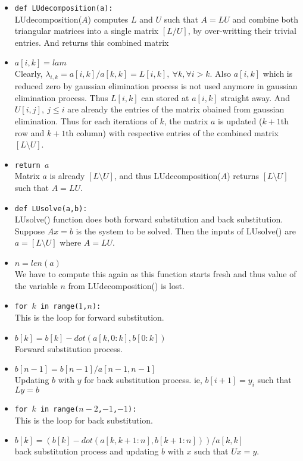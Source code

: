 \begin{remark}
\begin{commentary}
	\begin{itemize}
		\item \texttt{def LUdecomposition(a):} \\ LUdecomposition($A$) computes $L$ and $U$ such that $A = LU$ and combine both triangular matrices into a single matrix $[L/U]$, by over-writting their trivial entries. And returns this combined matrix
		\item \texttt{$a[i,k]=lam$} \\ Clearly, $\lambda_{i,k} = a[i,k]/a[k,k] = L[i,k],\ \forall k, \forall i>k$. Also $a[i,k]$ which is reduced zero by gaussian elimination process is not used anymore in gaussian elimination process. Thus $L[i,k]$ can stored at $a[i,k]$ straight away. And $U[i,j],\ j\le i$ are already the entries of the matrix obained from gaussian elimination. Thus for each iterations of $k$, the matrix $a$ is updated ($k+1$th row and $k+1$th column) with respective entries of the combined matrix $[L\text{\textbackslash{}}U]$.
		\item \texttt{return $a$} \\ Matrix $a$ is already $[L\text{\textbackslash{}}U]$, and thus LUdecomposition($A$) returns $[L\text{\textbackslash{}}U]$ such that $A = LU$.
		\item \texttt{def LUsolve(a,b):} \\ LUsolve() function does both forward substitution and back substitution. Suppose $Ax = b$ is the system to be solved. Then the inputs of LUsolve() are $ a = [L\text{\textbackslash{}}U]$ where $A = LU$. 
		\item \texttt{$n = len(a)$} \\ We have to compute this again as this function starts fresh and thus value of the variable $n$ from LUdecomposition() is lost.
		\item \texttt{for $k$ in range($1$,$n$):} \\ This is the loop for forward substitution.
		\item \texttt{$b[k] = b[k]-dot(a[k,0:k],b[0:k])$} \\ Forward substitution process.
		\item \texttt{$b[n-1] = b[n-1]/a[n-1,n-1]$} \\ Updating $b$ with $y$ for back substitution process. ie, $b[i+1]=y_i$ such that $Ly = b$
		\item \texttt{for $k$ in range($n-2$,$-1$,$-1$):}  \\ This is the loop for back substitution.
		\item \texttt{$b[k] = (b[k] - dot(a[k,k+1:n],b[k+1:n]))/a[k,k]$} \\ back substitution process and updating $b$ with $x$ such that $Ux = y$.

\end{itemize}
\end{commentary}
\end{remark}
